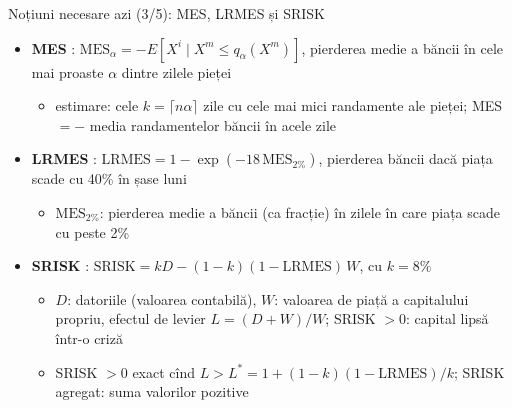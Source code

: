 \begin{frame}{Noțiuni necesare azi (3/5): MES, LRMES și SRISK}
\itemsize{\footnotesize}
\begin{itemize}
    \item \textbf{MES} : $\mathrm{MES}_\alpha = -E[X^i \mid X^m \le q_\alpha(X^m)]$, pierderea medie a băncii în cele mai proaste $\alpha$ dintre zilele pieței
    \begin{itemize}
        \item estimare: cele $k = \lceil n\alpha \rceil$ zile cu cele mai mici randamente ale pieței; MES $= -$ media randamentelor băncii în acele zile
    \end{itemize}
    \item \textbf{LRMES} : $\mathrm{LRMES} = 1 - \exp(-18\,\mathrm{MES}_{2\%})$, pierderea băncii dacă piața scade cu 40\% în șase luni
    \begin{itemize}
        \item $\mathrm{MES}_{2\%}$: pierderea medie a băncii (ca fracție) în zilele în care piața scade cu peste 2\%
    \end{itemize}
    \item \textbf{SRISK} : $\mathrm{SRISK} = kD - (1 - k)(1 - \mathrm{LRMES})\,W$, cu $k = 8\%$
    \begin{itemize}
        \item $D$: datoriile (valoarea contabilă), $W$: valoarea de piață a capitalului propriu, efectul de levier $L = (D + W)/W$; SRISK $> 0$: capital lipsă într-o criză
        \item SRISK $> 0$ exact cînd $L > L^* = 1 + (1 - k)(1 - \mathrm{LRMES})/k$; SRISK agregat: suma valorilor pozitive
    \end{itemize}
\end{itemize}
\end{frame}

